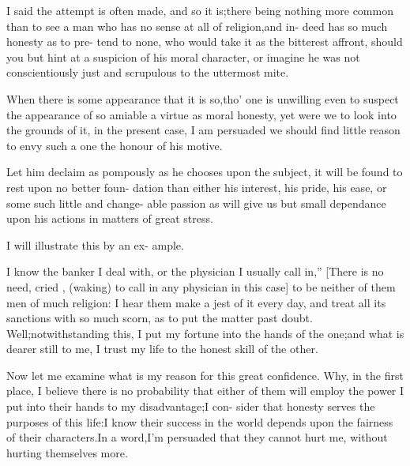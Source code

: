 \documentclass[twoside]{article}
\begin{document}
\lqq I said the attempt is often made,\break
\lqq and so it is;\tsh there being nothing
\lqq more common than to see a man who\break
\lqq has no sense at all of religion,\tsk and in-\break
\lqq deed has so much honesty as to pre-\break
\lqq tend to none, who would take it as the\break
\lqq bitterest affront, should you but hint at\break
\lqq a suspicion of his moral character,\tsh\break
\lqq or imagine he was not conscientiously\break
\lqq just and scrupulous to the uttermost\break
\lqq mite.

\lqq When there is some appearance that\break
\lqq it is so,\tsk tho’ one is unwilling even to\break
\lqq suspect the appearance of so amiable a\break
\lqq virtue as moral honesty, yet were we\break
\lqq to look into the grounds of it, in the\break
\lqq present case, I am persuaded we should\break
\lqq find little reason to envy such a one\break
\lqq the honour of his motive.

\lqq Let him declaim as pompously as\break
\lqq he chooses upon the subject, it will
\lqq be found to rest upon no better foun-\break
\lqq dation than either his interest, his pride,\break
\lqq his ease, or some such little and change-\break
\lqq able passion as will give us but small\break
\lqq dependance upon his actions in matters\break
\lqq of great stress.

\lqq I will illustrate this by an ex-\break
\lqq ample.

\lqq I know the banker I deal with, or\break
\lqq the physician I usually call in,” [There\break
is no need, cried \drslop, (waking) to call\break
in any physician in this case] \lqq to be\break
\lqq neither of them men of much religion:\break
\lqq I hear them make a jest of it every\break
\lqq day, and treat all its sanctions with so\break
\lqq much scorn, as to put the matter past\break
\lqq doubt.  Well;\tsk notwithstanding this,\break
\lqq I put my fortune into the hands of the\break
\lqq one;\tsk and what is dearer still to me,
\lqq I trust my life to the honest skill of\break
\lqq the other.

\lqq Now let me examine what is my\break
\lqq reason for this great confidence.\tsh\break
\lqq Why, in the first place, I believe there\break
\lqq is no probability that either of them\break
\lqq will employ the power I put into their\break
\lqq hands to my disadvantage;\tsk I con-\break
\lqq sider that honesty serves the purposes\break
\lqq of this life:\tsk I know their success in\break
\lqq the world depends upon the fairness of\break
\lqq their characters.\tsk In a word,\tsk I’m\break
\lqq persuaded that they cannot hurt me,\break
\lqq without hurting themselves more.
\end{document}
